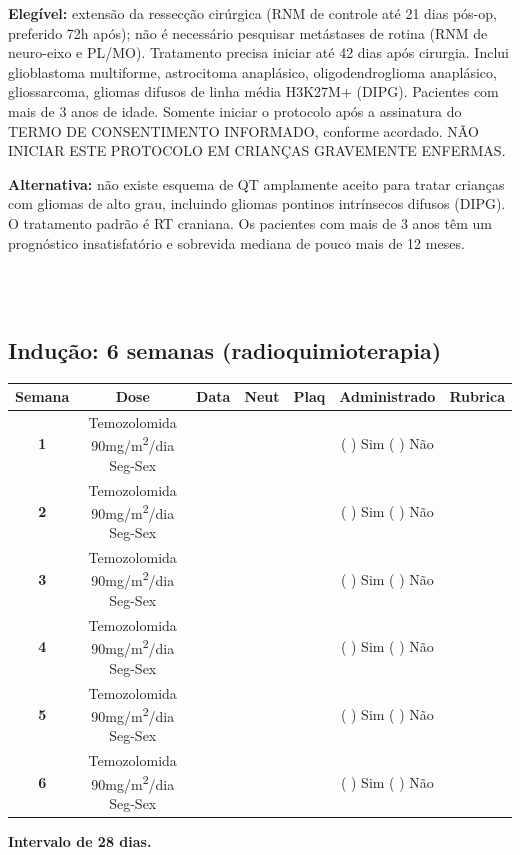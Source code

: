 \documentclass[11pt,a4paper,oldfontcommands]{memoir}
\begin{document}
\textbf{Elegível:} extensão da ressecção cirúrgica (RNM de controle até 21 dias pós-op, preferido 72h após); não é necessário pesquisar metástases de rotina (RNM de neuro-eixo e PL/MO). Tratamento precisa iniciar até 42 dias após cirurgia. Inclui glioblastoma multiforme, astrocitoma anaplásico, oligodendroglioma anaplásico, gliossarcoma, gliomas difusos de linha média H3K27M+ (DIPG). Pacientes com mais de 3 anos de idade. Somente iniciar o protocolo após a assinatura do TERMO DE CONSENTIMENTO INFORMADO, conforme acordado. NÃO INICIAR ESTE PROTOCOLO EM CRIANÇAS GRAVEMENTE ENFERMAS.

\textbf{Alternativa:} não existe esquema de QT amplamente aceito para tratar crianças com gliomas de alto grau, incluindo gliomas pontinos intrínsecos difusos (DIPG). O tratamento padrão é RT craniana. Os pacientes com mais de 3 anos têm um prognóstico insatisfatório e sobrevida mediana de pouco mais de 12 meses.

\hfill \\

\hfill  {}\\

\subsection{Indução: 6 semanas (radioquimioterapia)}

\renewcommand{\arraystretch}{1.5}

\begin{center}
\begin{longtable}{p{1cm}c|c|c|c|c|c}
	\hline
\multicolumn{1}{c|}{\multirow{1}{*}{\textbf{Semana}}}&{Dose}&{Data}&{Neut}&{Plaq}&{Administrado}&{Rubrica} \\
    \hline
    \multicolumn{1}{c|}{\multirow{1}{*}{\textbf{1}}}&{Temozolomida 90mg/m\textsuperscript{2}/dia Seg-Sex}&{}&&&{(  ) Sim (  ) Não}&\\
    \cline{3-5}
    \multicolumn{1}{c|}{\multirow{1}{*}{{\textbf{2}}}}&{Temozolomida 90mg/m\textsuperscript{2}/dia Seg-Sex}&{}&&&{(  ) Sim (  ) Não}&\\
    \cline{3-5}
    \multicolumn{1}{c|}{\multirow{1}{*}{{\textbf{3}}}}&{Temozolomida 90mg/m\textsuperscript{2}/dia Seg-Sex}&{}&&&{(  ) Sim (  ) Não}&\\
    \cline{3-5}
    \multicolumn{1}{c|}{\multirow{1}{*}{{\textbf{4}}}}&{Temozolomida 90mg/m\textsuperscript{2}/dia Seg-Sex}&{}&&&{(  ) Sim (  ) Não}&\\
    \cline{3-5}
    \multicolumn{1}{c|}{\multirow{1}{*}{{\textbf{5}}}}&{Temozolomida 90mg/m\textsuperscript{2}/dia Seg-Sex}&{}&&&{(  ) Sim (  ) Não}&\\
    \cline{3-5}
    \multicolumn{1}{c|}{\multirow{1}{*}{{\textbf{6}}}}&{Temozolomida 90mg/m\textsuperscript{2}/dia Seg-Sex}&{}&&&{(  ) Sim (  ) Não}&\\
    \hline
\end{longtable}
\textbf{Intervalo de 28 dias.}
\end{center}
\clearpage
\end{document}
